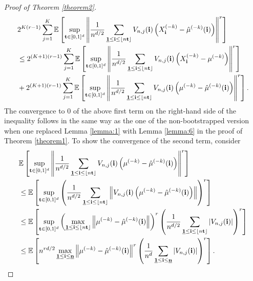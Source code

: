 \begin{proof}[Proof of Theorem \ref{theorem2}]
    \begin{align*}
        & 2^{K(r-1)} \sum\limits_{j=1}^K \EE{\sup\limits_{\mathbf{t}\in [0,1]^d} \left\| \frac{1}{n^{d/2}} \sum\limits_{\usbf[1] \leq \mathbf{i} \leq \floor{n \mathbf{t}}} V_{n, j}(\mathbf{i}) \left(X_\mathbf{i}^{(-k)} - \hat{\mu}^{(-k)}(\mathbf{i}) \right) \right\|^r} \\
        & \leq 2^{(K+1)(r-1)} \sum\limits_{j=1}^K \EE{\sup\limits_{\mathbf{t}\in [0,1]^d} \left\| \frac{1}{n^{d/2}} \sum\limits_{\usbf[1] \leq \mathbf{i} \leq \floor{n \mathbf{t}}} V_{n, j}(\mathbf{i}) \left(X_\mathbf{i}^{(-k)} - \mu^{(-k)} \right) \right\|^r} \\
        & + 2^{(K+1)(r-1)} \sum\limits_{j=1}^K \EE{\sup\limits_{\mathbf{t}\in [0,1]^d} \left\| \frac{1}{n^{d/2}} \sum\limits_{\usbf[1] \leq \mathbf{i} \leq \floor{n \mathbf{t}}} V_{n, j}(\mathbf{i}) \left(\mu^{(-k)} - \hat{\mu}^{(-k)}(\mathbf{i}) \right) \right\|^r}.
    \end{align*}
    The convergence to $0$ of the above first term on the right-hand side of the inequality follows in the same way as the one of the non-bootstrapped version when one replaced Lemma \ref{lemma:1} with Lemma \ref{lemma:6} in the proof of Theorem \ref{theorem1}. To show the convergence of the second term, consider
    \begin{align*}
        & \EE{\sup\limits_{\mathbf{t}\in [0,1]^d} \left\| \frac{1}{n^{d/2}} \sum\limits_{\usbf[1] \leq \mathbf{i} \leq \floor{n \mathbf{t}}} V_{n, j}(\mathbf{i}) \left(\mu^{(-k)} - \hat{\mu}^{(-k)}(\mathbf{i}) \right) \right\|^r} \\
        & \leq \EE{\sup\limits_{\mathbf{t}\in [0,1]^d} \left( \frac{1}{n^{d/2}} \sum\limits_{\usbf[1] \leq \mathbf{i} \leq \floor{n \mathbf{t}}} \left\| V_{n, j}(\mathbf{i}) \left(\mu^{(-k)} - \hat{\mu}^{(-k)}(\mathbf{i}) \right) \right\| \right)^r} \\
        & \leq \EE{\sup\limits_{\mathbf{t}\in [0,1]^d} \left( \max\limits_{\usbf[1] \leq \mathbf{i} \leq \floor{n \mathbf{t}}} \left\| \mu^{(-k)} - \hat{\mu}^{(-k)}(\mathbf{i}) \right\| \right)^r \left( \frac{1}{n^{d/2}} \sum\limits_{\usbf[1] \leq \mathbf{i} \leq \floor{n \mathbf{t}}} |V_{n, j}(\mathbf{i})| \right)^r} \\
        & \leq \EE{ n^{rd/2} \max\limits_{\usbf[1] \leq \mathbf{i} \leq \usbf[n]} \left\| \mu^{(-k)} - \hat{\mu}^{(-k)}(\mathbf{i}) \right\|^r \left( \frac{1}{n^{d}} \sum\limits_{\usbf[1] \leq \mathbf{i} \leq \usbf[n]} |V_{n, j}(\mathbf{i})| \right)^r}.
    \end{align*}

\end{proof}
